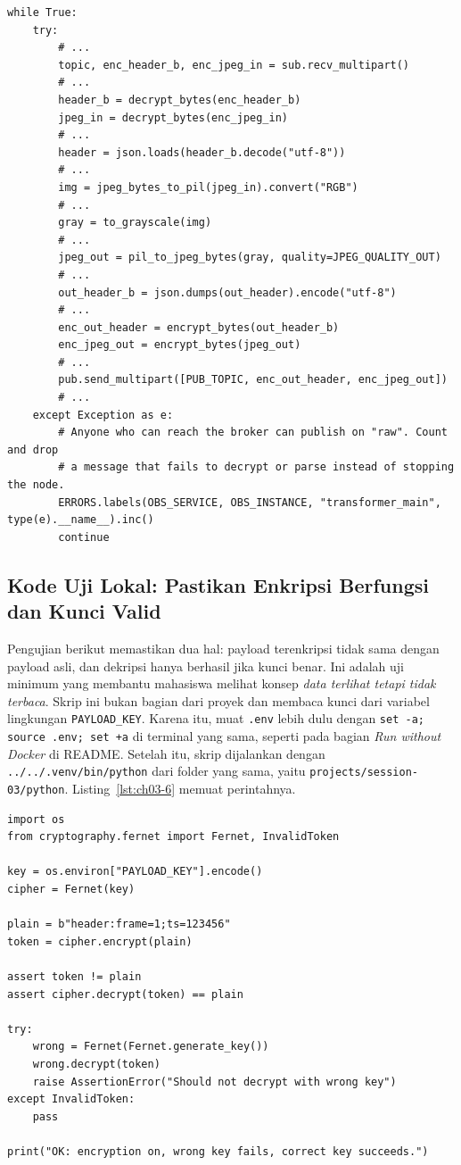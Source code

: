 \begin{lstlisting}[style=PythonStyle, caption={transformer/transformer.py (excerpt): decrypt input, encrypt output payload}, label={lst:ch03-5}]
while True:
    try:
        # ...
        topic, enc_header_b, enc_jpeg_in = sub.recv_multipart()
        # ...
        header_b = decrypt_bytes(enc_header_b)
        jpeg_in = decrypt_bytes(enc_jpeg_in)
        # ...
        header = json.loads(header_b.decode("utf-8"))
        # ...
        img = jpeg_bytes_to_pil(jpeg_in).convert("RGB")
        # ...
        gray = to_grayscale(img)
        # ...
        jpeg_out = pil_to_jpeg_bytes(gray, quality=JPEG_QUALITY_OUT)
        # ...
        out_header_b = json.dumps(out_header).encode("utf-8")
        # ...
        enc_out_header = encrypt_bytes(out_header_b)
        enc_jpeg_out = encrypt_bytes(jpeg_out)
        # ...
        pub.send_multipart([PUB_TOPIC, enc_out_header, enc_jpeg_out])
        # ...
    except Exception as e:
        # Anyone who can reach the broker can publish on "raw". Count and drop
        # a message that fails to decrypt or parse instead of stopping the node.
        ERRORS.labels(OBS_SERVICE, OBS_INSTANCE, "transformer_main", type(e).__name__).inc()
        continue
\end{lstlisting}

\subsection*{Kode Uji Lokal: Pastikan Enkripsi Berfungsi dan Kunci Valid}

Pengujian berikut memastikan dua hal: payload terenkripsi tidak sama dengan payload asli, dan dekripsi hanya berhasil jika kunci benar. Ini adalah uji minimum yang membantu mahasiswa melihat konsep \emph{data terlihat tetapi tidak terbaca}. Skrip ini bukan bagian dari proyek dan membaca kunci dari variabel lingkungan \texttt{PAYLOAD\_KEY}. Karena itu, muat \texttt{.env} lebih dulu dengan \texttt{set -a; source .env; set +a} di terminal yang sama, seperti pada bagian \emph{Run without Docker} di README. Setelah itu, skrip dijalankan dengan \texttt{../../.venv/bin/python} dari folder yang sama, yaitu \texttt{projects/session-03/python}. Listing~\ref{lst:ch03-6} memuat perintahnya.

\begin{lstlisting}[style=PythonStyle, caption={Quick test: encrypt/decrypt roundtrip}, label={lst:ch03-6}]
import os
from cryptography.fernet import Fernet, InvalidToken

key = os.environ["PAYLOAD_KEY"].encode()
cipher = Fernet(key)

plain = b"header:frame=1;ts=123456"
token = cipher.encrypt(plain)

assert token != plain
assert cipher.decrypt(token) == plain

try:
    wrong = Fernet(Fernet.generate_key())
    wrong.decrypt(token)
    raise AssertionError("Should not decrypt with wrong key")
except InvalidToken:
    pass

print("OK: encryption on, wrong key fails, correct key succeeds.")
\end{lstlisting}

